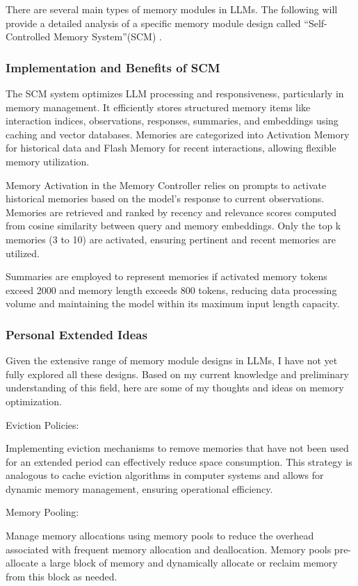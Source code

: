 \documentclass[conference]{IEEEtran}
\begin{document}
There are several main types of memory modules in LLMs. The following will provide a detailed analysis of a specific memory module design called “Self-Controlled Memory System”(SCM) \cite{b3}.

\subsubsection{Implementation and Benefits of SCM}
The SCM system optimizes LLM processing and responsiveness, particularly in memory management. It efficiently stores structured memory items like interaction indices, observations, responses, summaries, and embeddings using caching and vector databases. Memories are categorized into Activation Memory for historical data and Flash Memory for recent interactions, allowing flexible memory utilization.

Memory Activation in the Memory Controller relies on prompts to activate historical memories based on the model's response to current observations. Memories are retrieved and ranked by recency and relevance scores computed from cosine similarity between query and memory embeddings. Only the top k memories (3 to 10) are activated, ensuring pertinent and recent memories are utilized.

Summaries are employed to represent memories if activated memory tokens exceed 2000 and memory length exceeds 800 tokens, reducing data processing volume and maintaining the model within its maximum input length capacity.

\subsubsection{Personal Extended Ideas}
Given the extensive range of memory module designs in LLMs, I have not yet fully explored all these designs. Based on my current knowledge and preliminary understanding of this field, here are some of my thoughts and ideas on memory optimization.

Eviction Policies:

Implementing eviction mechanisms to remove memories that have not been used for an extended period can effectively reduce space consumption. This strategy is analogous to cache eviction algorithms in computer systems and allows for dynamic memory management, ensuring operational efficiency.

Memory Pooling:

Manage memory allocations using memory pools to reduce the overhead associated with frequent memory allocation and deallocation. Memory pools pre-allocate a large block of memory and dynamically allocate or reclaim memory from this block as needed.
\end{document}
